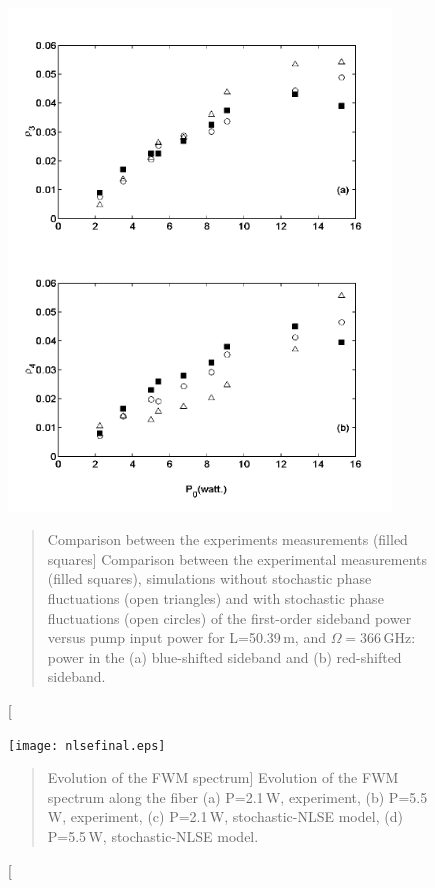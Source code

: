 \begin{figure}
\hspace{1.25in}
\includegraphics[width=4in]{nlsefinal.pdf}
\renewcommand{\baselinestretch}{1}
\small\normalsize
\begin{quote}
\caption
[Comparison between the experiments measurements (filled squares]
{Comparison between the experimental measurements (filled squares), simulations without stochastic phase fluctuations (open triangles) and with stochastic phase fluctuations (open circles) of the first-order sideband power versus pump input power for L=50.39\,m, and $\Omega = 366$\,GHz: power in the (a) blue-shifted sideband and (b) red-shifted sideband.}
\label{fig2.8}
\end{quote}
\end{figure}

\begin{figure}
\begin{center}
\texttt{[image: nlsefinal.eps]}
\end{center}
\renewcommand{\baselinestretch}{1}
\small\normalsize
\begin{quote}
\caption
[Evolution of the FWM spectrum]
{Evolution of the FWM spectrum along the fiber (a) P=2.1\,W, experiment, (b) P=5.5\,W, experiment, (c) P=2.1\,W, stochastic-NLSE model, (d) P=5.5\,W, stochastic-NLSE model.}
\label{fig2.9}
\end{quote}
\end{figure}
\renewcommand{\baselinestretch}{2}
\small\normalsize

